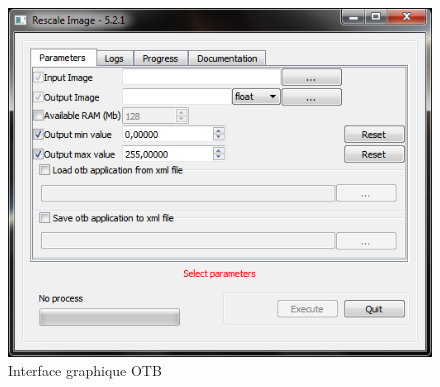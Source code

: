 \documentclass[10pt,a4paper]{article}
\begin{document}
\begin{figure}[h]
  \center
  \includegraphics[scale=1]{Art/windows-otbgui.png}
  \caption[]{Interface graphique OTB}
  \label{fig:windows-otbgui}
\end{figure}

\end{document}
